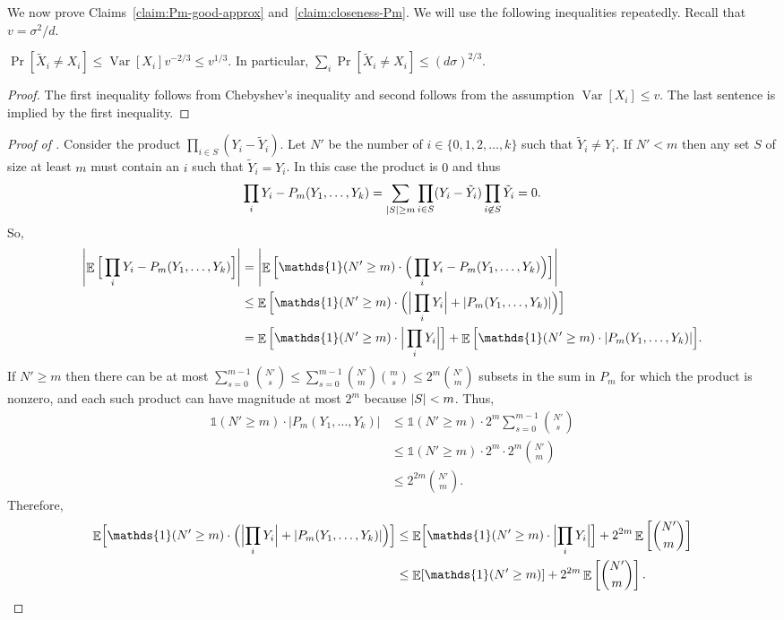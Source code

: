 \documentclass{toc}
\def\1{\mathds{1}}
\DeclarePairedDelimiter{\abs}{\lvert}{\rvert}
\DeclareMathOperator*{\E}{\mathbb{E}}                 %
\DeclareMathOperator*{\Var}{Var}                 %
\begin{document}
  We now prove Claims~\ref{claim:Pm-good-approx} and~\ref{claim:closeness-Pm}.
  We will use the following inequalities repeatedly.
  Recall that $v = \sigma^2/d$.

  \begin{claim} \label{claim-prob-x-neq-x-tilde}
    $\Pr[\tilde X_i \neq X_i] \le \Var[X_i] v^{-2/3}  \le v^{1/3}$.
    In particular, $\sum_i \Pr[\tilde X_i \neq X_i] \le (d \sigma)^{2/3}$.
  \end{claim}
  \begin{proof}
    The first inequality follows from Chebyshev's inequality and second follows from the assumption $\Var[X_i] \le v$.
    The last sentence is implied by the first inequality.
  \end{proof}

  \begin{proof} [Proof of {}]
    Consider the product $\prod_{i \in S} (Y_i - \tilde Y_i)$.
    Let $N'$ be the number of $i \in \{0, 1, 2, \ldots, k\}$ such that $\tilde Y_i \neq Y_i$.
    If $N' < m$ then any set $S$ of size at least $m$ must contain an $i$ such that $\tilde Y_i = Y_i$.
    In this case the product is $0$ and thus
    \begin{align*}
      \prod_i Y_i - P_m(Y_1, \ldots, Y_k)
      = \sum_{\abs{S} \ge m} \prod_{i \in S} (Y_i - \tilde Y_i) \prod_{i \not\in S} \tilde Y_i
      = 0 .
    \end{align*}
    So,
    \begin{align*}
      \abs*{ \E \Big[ \prod_i Y_i - P_m(Y_1, \ldots, Y_k) \Big] }
      &= \abs*{ \E \Big[ \1(N' \ge m) \cdot \Big( \prod_i Y_i - P_m(Y_1, \ldots, Y_k) \Big) \Big] } \\
      &\le \E \Big[\1(N' \ge m) \cdot \Big( \Big| \prod_i Y_i \Big| + \abs{P_m(Y_1, \ldots, Y_k)} \Big) \Big] \\
      &= \E \Big[\1(N' \ge m) \cdot \Big| \prod_i Y_i \Big| \Big] + \E \Big[ \1(N' \ge m) \cdot \abs{P_m(Y_1, \ldots, Y_k)} \Big] .
    \end{align*}
    If $N' \ge m$ then there can be at most $\sum_{s = 0}^{m - 1} \binom{N'}{s} \le \sum_{s = 0}^{m-1} \binom{N'}{m} \binom{m}{s} \le 2^m \binom{N'}{m}$ subsets in the sum in $P_m$ for which the product is nonzero, and each such product can have magnitude at most $2^m$ because $\abs{S} < m$.
    Thus,
    \begin{align*}
      \1(N' \ge m) \cdot \Big| P_m(Y_1, \ldots, Y_k) \Big|
      &\le \1(N' \ge m) \cdot 2^m \sum_{s= 0}^{m - 1} \binom{N'}{s} \\
      &\le \1(N' \ge m) \cdot 2^m \cdot 2^m \binom{N'}{m} \\
      &\le 2^{2m} \binom{N'}{m} .
    \end{align*}
    Therefore,
    \begin{align*}
      \E \Bigl[\1(N' \ge m) \cdot \Bigl( \Bigl| \prod_i Y_i \Bigr| + \abs{P_m(Y_1, \ldots, Y_k)} \Bigr) \Bigr]
      &\le \E \Bigl[\1(N' \ge m) \cdot \Bigl| \prod_i Y_i \Bigr| \Bigr] + 2^{2m} \E \left[ \binom{N'}{m} \right] \\
      &\le \E[ \1(N' \ge m) ] + 2^{2m} \E \left[ \binom{N'}{m} \right] .
    \end{align*}


\end{proof}
\end{document}
